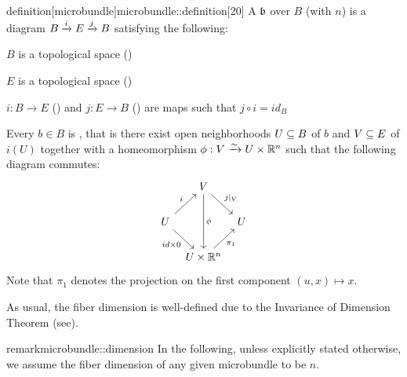 \begin{mystatement}{definition}[microbundle]{microbundle::definition}[20]
    A  $\bb$ over $B$ (with  $n$)
    is a diagram $\bundle{B}{E}{i}{j}$ satisfying the following:
    \begin{properties}
        \item $B$ is a topological space ()
        \item $E$ is a topological space ()
        \item $i: B \to E$ () and $j: E \to B$ ()
        are maps such that $j \circ i = id_B$
        \item Every $b \in B$ is ,
        that is there exist open neighborhoods $U \sub B$ of $b$ and $V \sub E$ of $i(U)$
        together with a homeomorphism $\phi: V \isomto U \cross \R^n$ such that the following diagram commutes:
        \[
            \begin{tikzcd}[column sep=tiny]
                & V \ar[dr, "j\vert_V"] \ar[dd, "\phi"] & \\
                U \ar[ur, "i"] \ar[dr, "{id \cross 0}"'] & & U \\
                & U \cross\R^n \ar[ur, "\pi_1"'] &
            \end{tikzcd}
        \]
        Note that $\pi_1$ denotes the projection on the first component $(u, x) \mapsto x$.
    \end{properties}
\end{mystatement}

As usual, the fiber dimension is well-defined due to the Invariance of Dimension Theorem (see\cite[cor.19.10]{brendon}).
\begin{mystatement}{remark}{microbundle::dimension}
    In the following, unless explicitly stated otherwise,
    we assume the fiber dimension of any given microbundle to be $n$.
\end{mystatement}